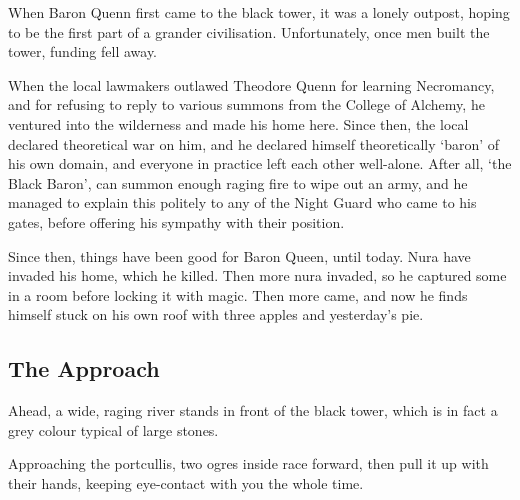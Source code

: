\begin{multicols}{2}

\begin{exampletext}

	When Baron Quenn first came to the black tower, it was a lonely outpost, hoping to be the first part of a grander civilisation.
	Unfortunately, once men built the tower, funding fell away.

	When the local lawmakers outlawed Theodore Quenn for learning Necromancy, and for refusing to reply to various summons from the College of Alchemy, he ventured into the wilderness and made his home here.
	Since then, the local declared theoretical war on him, and he declared himself theoretically `baron' of his own domain, and everyone in practice left each other well-alone.
	After all, `the Black Baron', can summon enough raging fire to wipe out an army, and he managed to explain this politely to any of the Night Guard who came to his gates, before offering his sympathy with their position.

	Since then, things have been good for Baron Queen, until today.
	Nura have invaded his home, which he killed.
	Then more nura invaded, so he captured some in a room before locking it with magic.
	Then more came, and now he finds himself stuck on his own roof with three apples and yesterday's pie.

\end{exampletext}

\subsection{The Approach}

\setcounter{list}{0}

\begin{boxtext}

	Ahead, a wide, raging river stands in front of the black tower, which is in fact a grey colour typical of large stones.

\end{boxtext}



\begin{boxtext}

	Approaching the portcullis, two ogres inside race forward, then pull it up with their hands, keeping eye-contact with you the whole time.

\end{boxtext}


\end{multicols}
